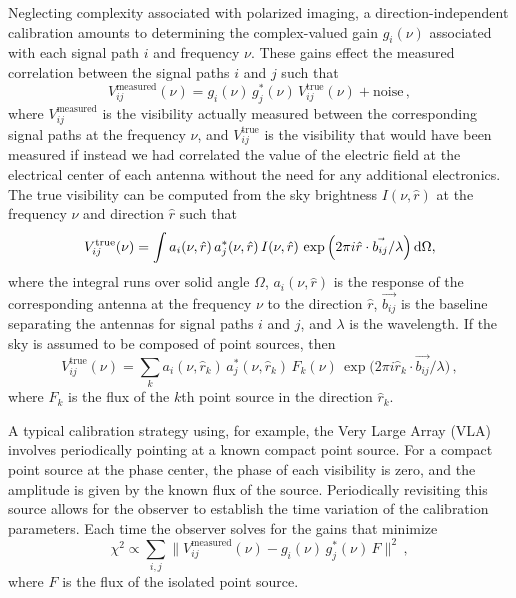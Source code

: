 \begin{bibunit}
Neglecting complexity associated with polarized imaging, a direction-independent calibration amounts
to determining the complex-valued gain $g_i(\nu)$ associated with each signal path $i$ and frequency
$\nu$. These gains effect the measured correlation between the signal paths $i$ and $j$ such that
\begin{equation}
    V_{ij}^\text{measured}(\nu) = g_i(\nu)\,g_j^*(\nu)\,V_{ij}^\text{true}(\nu)
        + \text{noise}\,,
\end{equation}
where $V_{ij}^\text{measured}$ is the visibility actually measured between the corresponding signal
paths at the frequency $\nu$, and $V_{ij}^\text{true}$ is the visibility that would have been
measured if instead we had correlated the value of the electric field at the electrical center of
each antenna without the need for any additional electronics. The true visibility
can be computed from the sky brightness $I(\nu, \hat{r})$ at the
frequency $\nu$ and direction $\hat r$ such that
\begin{equation}
    V_{ij}^\text{true}(\nu) = \int a_i(\nu, \hat{r})\,a_j^*(\nu, \hat{r})\,I(\nu, \hat{r})\,
        \exp\Big(2\pi i\hat{r}\cdot\vec{b_{ij}}/\lambda\Big)\,{\textrm d}\Omega,
\end{equation}
where the integral runs over solid angle $\Omega$, $a_i(\nu, \hat{r})$ is the response of the
corresponding antenna at the frequency $\nu$ to the direction $\hat{r}$, $\vec{b_{ij}}$ is the
baseline separating the antennas for signal paths $i$ and $j$, and $\lambda$ is the wavelength.  If
the sky is assumed to be composed of point sources, then
\begin{equation}\label{eq:antenna-response-point-sources}
    V_{ij}^\text{true}(\nu) = \sum_k a_i(\nu, \hat{r}_k)\,a_j^*(\nu, \hat{r}_k)\,F_k(\nu)\,
        \exp\Big(2\pi i\hat{r}_k\cdot\vec{b_{ij}}/\lambda\Big)\,,
\end{equation}
where $F_k$ is the flux of the $k$th point source in the direction $\hat{r}_k$.

A typical calibration strategy using, for example, the Very Large Array (VLA) involves periodically
pointing at a known compact point source. For a compact point source at the phase center, the phase
of each visibility is zero, and the amplitude is given by the known flux of the source.
Periodically revisiting this source allows for the observer to establish the time variation of the
calibration parameters. Each time the observer solves for the gains that minimize
\begin{equation}
    \chi^2 \propto \sum_{i, j}
        \Big\|V_{ij}^\text{measured}(\nu) - g_i(\nu)\,g_j^*(\nu)\,F\Big\|^2\,,
\end{equation}
where $F$ is the flux of the isolated point source.


\end{bibunit}
